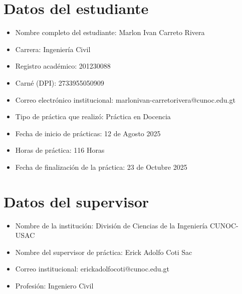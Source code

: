 \documentclass[12pt]{article}
\begin{document}
	\pagestyle{empty}
	
	
	\section*{Datos del estudiante}
	\begin{itemize}[label=$\blacksquare$]
		\item Nombre completo del estudiante:  Marlon Ivan Carreto Rivera
		\item Carrera: Ingeniería Civil
		\item Registro académico: 201230088
		\item Carné (DPI): 2733955050909 
		\item Correo electrónico institucional: marlonivan-carretorivera@cunoc.edu.gt
		\item Tipo de práctica que realizó: Práctica en Docencia
		\item Fecha de inicio de prácticas: 12 de Agosto 2025
		\item Horas de práctica: 116 Horas 
		\item Fecha de finalización de la práctica: 23 de Octubre 2025
	
	\end{itemize}
	
	\section*{Datos del supervisor}
	\begin{itemize}[label=$\blacksquare$]
		\item Nombre de la institución: División de Ciencias de la Ingeniería CUNOC-USAC
		\item Nombre del supervisor de práctica: Erick Adolfo Coti Sac
		\item Correo institucional: erickadolfocoti@cunoc.edu.gt
		\item Profesión: Ingeniero Civil
	\end{itemize}
	
\end{document}
